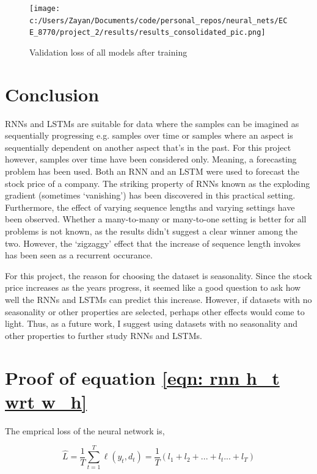 \documentclass[12pt, letterpaper]{article}
\begin{document}
\begin{figure}
    \centering
    \texttt{[image: c:/Users/Zayan/Documents/code/personal\_repos/neural\_nets/ECE\_8770/project\_2/results/results\_consolidated\_pic.png]}
    \caption{Validation loss of all models after training}
    \label{fig: table of results}
\end{figure}

\section{Conclusion}

RNNs and LSTMs are suitable for data where the samples can be imagined as 
sequentially progressing e.g. samples over time or samples where an aspect is 
sequentially dependent on another aspect that's in the past. For this project 
however, samples over time have been considered only. Meaning, a forecasting problem 
has been used. Both an RNN and an LSTM were used to forecast the stock price of a company.
The striking property of RNNs known as the exploding gradient (sometimes `vanishing') has 
been discovered in this practical setting. Furthermore, the effect of varying 
sequence lengths and varying settings have been observed. Whether a many-to-many 
or many-to-one setting is better for all problems is not known, as the results didn't
suggest a clear winner among the two. However, the `zigzaggy' effect that the increase 
of sequence length invokes has been seen as a recurrent occurance. 

For this project, the reason for choosing the dataset is seasonality. Since the 
stock price increases as the years progress, it seemed like a good question to ask 
how well the RNNs and LSTMs can predict this increase. However, if datasets with no
seasonality or other properties are selected, perhaps other effects would come to light.
Thus, as a future work, I suggest using datasets with no seasonality and other properties 
to further study RNNs and LSTMs. 

\clearpage
\printbibliography

\appendix

\section{Proof of equation \ref{eqn: rnn h_t wrt w_h}}

The emprical loss of the neural network is,

\begin{equation}
    \hat{L} = \frac{1}{T} \sum_{t=1}^{T} \ell(y_t, d_t) = \frac{1}{T} (l_1 + l_2 + ... + l_t ... + l_T)
\end{equation}
\end{document}

